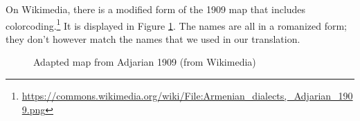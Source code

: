 On Wikimedia, there is a modified form of the 1909 map that includes colorcoding.\footnote{\url{https://commons.wikimedia.org/wiki/File:Armenian_dialects,_Adjarian_1909.png}} It   is displayed in Figure \ref{map:Adjarian1909color}. The names are all in a romanized form; they don't however match the names that we used in our translation. 



\begin{figure}[H]
	\caption{Adapted map from Adjarian 1909 (from Wikimedia)}
	\label{map:Adjarian1909color}
\end{figure}
